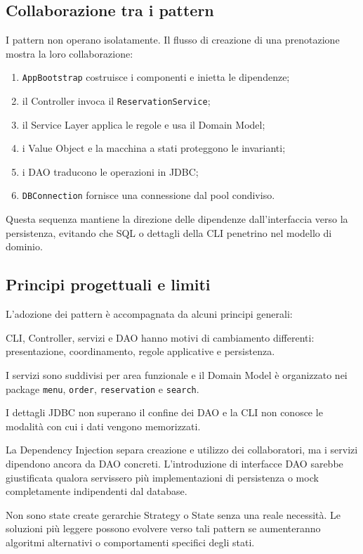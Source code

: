 \documentclass[12pt,a4paper]{article}
\newcommand{\code}[1]{\nolinkurl{#1}}
\begin{document}
\subsection{Collaborazione tra i pattern}

I pattern non operano isolatamente. Il flusso di creazione di una prenotazione
mostra la loro collaborazione:

\begin{enumerate}[leftmargin=*]
  \item \code{AppBootstrap} costruisce i componenti e inietta le dipendenze;
  \item il Controller invoca il \code{ReservationService};
  \item il Service Layer applica le regole e usa il Domain Model;
  \item i Value Object e la macchina a stati proteggono le invarianti;
  \item i DAO traducono le operazioni in JDBC;
  \item \code{DBConnection} fornisce una connessione dal pool condiviso.
\end{enumerate}

Questa sequenza mantiene la direzione delle dipendenze dall'interfaccia verso la
persistenza, evitando che SQL o dettagli della CLI penetrino nel modello di
dominio.

\subsection{Principi progettuali e limiti}

L'adozione dei pattern è accompagnata da alcuni principi generali:

\begin{description}[leftmargin=3.4cm,style=nextline]
  \item[Responsabilità singola]
  CLI, Controller, servizi e DAO hanno motivi di cambiamento differenti:
  presentazione, coordinamento, regole applicative e persistenza.

  \item[Alta coesione]
  I servizi sono suddivisi per area funzionale e il Domain Model è organizzato
  nei package \code{menu}, \code{order}, \code{reservation} e \code{search}.

  \item[Basso accoppiamento]
  I dettagli JDBC non superano il confine dei DAO e la CLI non conosce le
  modalità con cui i dati vengono memorizzati.

  \item[Inversione parziale]
  La Dependency Injection separa creazione e utilizzo dei collaboratori, ma i
  servizi dipendono ancora da DAO concreti. L'introduzione di interfacce DAO
  sarebbe giustificata qualora servissero più implementazioni di persistenza o
  mock completamente indipendenti dal database.

  \item[Semplicità]
  Non sono state create gerarchie Strategy o State senza una reale necessità.
  Le soluzioni più leggere possono evolvere verso tali pattern se aumenteranno
  algoritmi alternativi o comportamenti specifici degli stati.
\end{description}
\end{document}
